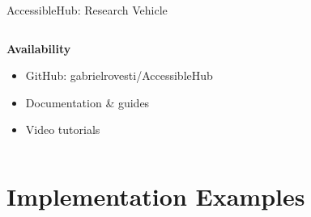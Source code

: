 \documentclass[10pt,aspectratio=169]{beamer}
\begin{document}
\begin{frame}{AccessibleHub: Research Vehicle}
\begin{columns}[c]
\begin{column}{0.4\textwidth}
            \vspace{0.3cm}
            
            \textbf{Availability}
            \begin{itemize}
                \item GitHub: gabrielrovesti/AccessibleHub
                \item Documentation \& guides
                \item Video tutorials
            \end{itemize}
        \end{column}
    \end{columns}
\end{frame}

\section{Implementation Examples}
\end{document}
